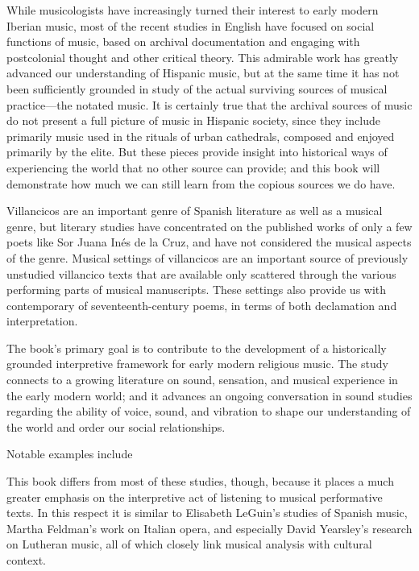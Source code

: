 \documentclass{vcbook-proposal}
\begin{document}
While musicologists have increasingly turned their interest to early modern 
Iberian music, most of the recent studies in English have focused on social 
functions of music, based on archival documentation and engaging with 
postcolonial thought and other critical theory.
This admirable work has greatly advanced our understanding of Hispanic music, 
but at the same time it has not been sufficiently grounded in study of the 
actual surviving sources of musical practice---the notated music.%
  \Autocites{Torrente:PhD}{Baker:Harmony}{Irving:Colonial}
  {BakerKnighton:MusicUrbanSociety}
It is certainly true that the archival sources of music do not present a full 
picture of music in Hispanic society, since they include primarily music used 
in the rituals of urban cathedrals, composed and enjoyed primarily by the elite.
But these pieces provide insight into historical ways of experiencing the world 
that no other source can provide; and this book will demonstrate how much we 
can still learn from the copious sources we do have.

Villancicos are an important genre of Spanish literature as well as a musical 
genre, but literary studies have concentrated on the published works 
of only a few poets like Sor Juana Inés de la Cruz, and have not 
considered the musical aspects of the genre.%
  \Autocite{Tenorio:SorJuana}
Musical settings of villancicos are an important source of previously unstudied 
villancico texts that are available only scattered through the various 
performing parts of musical manuscripts.
These settings also provide us with contemporary  of 
seventeenth-century poems, in terms of both declamation and interpretation.

The book's primary goal is to contribute to the development of a historically 
grounded interpretive framework for early modern religious music.
The study connects to a growing literature on sound, sensation, and musical
experience in the early modern world; and it advances an ongoing conversation in
sound studies regarding the ability of voice, sound, and vibration to shape our
understanding of the world and order our social relationships.%
  \begin{Footnote}
      Notable examples include \autocites{Rath:EarlyAmerica}{Feldman:Passions}
      {Austern:Nature}{Gouk:MusicScienceMagic}{Ochoa:Aurality}{Eidsheim:SensingSound}
  \end{Footnote}
This book differs from most of these studies, though, because it places a much
greater emphasis on the interpretive act of listening to musical performative
texts.
In this respect it is similar to Elisabeth LeGuin's studies of Spanish music,
Martha Feldman's work on Italian opera, and especially David Yearsley's research
on Lutheran music, all of which closely link musical analysis with cultural
context.%
    \Autocites{LeGuin:Tonadilla}{LeGuin:BoccheriniBody}
    {Feldman:Opera}{Yearsley:BachCounterpoint}
\end{document}
